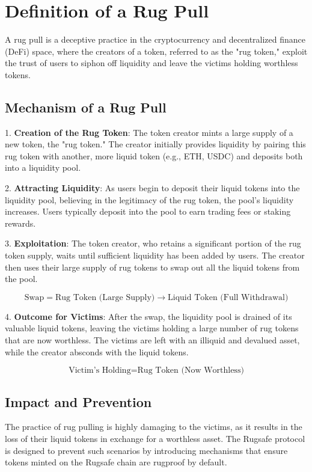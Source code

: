 \documentclass{article}
\begin{document}
\section{Definition of a Rug Pull}

A rug pull is a deceptive practice in the cryptocurrency and decentralized finance (DeFi) space, where the creators of a token, referred to as the "rug token," exploit the trust of users to siphon off liquidity and leave the victims holding worthless tokens.

\subsection{Mechanism of a Rug Pull}

1. \textbf{Creation of the Rug Token}: The token creator mints a large supply of a new token, the "rug token." The creator initially provides liquidity by pairing this rug token with another, more liquid token (e.g., ETH, USDC) and deposits both into a liquidity pool.

2. \textbf{Attracting Liquidity}: As users begin to deposit their liquid tokens into the liquidity pool, believing in the legitimacy of the rug token, the pool's liquidity increases. Users typically deposit into the pool to earn trading fees or staking rewards.

3. \textbf{Exploitation}: The token creator, who retains a significant portion of the rug token supply, waits until sufficient liquidity has been added by users. The creator then uses their large supply of rug tokens to swap out all the liquid tokens from the pool.

\[
\text{Swap} = \text{Rug Token (Large Supply)} \rightarrow \text{Liquid Token (Full Withdrawal)}
\]

4. \textbf{Outcome for Victims}: After the swap, the liquidity pool is drained of its valuable liquid tokens, leaving the victims holding a large number of rug tokens that are now worthless. The victims are left with an illiquid and devalued asset, while the creator absconds with the liquid tokens.

\[
\text{Victim's Holding} = \text{Rug Token (Now Worthless)}
\]

\subsection{Impact and Prevention}

The practice of rug pulling is highly damaging to the victims, as it results in the loss of their liquid tokens in exchange for a worthless asset. The Rugsafe protocol is designed to prevent such scenarios by introducing mechanisms that ensure tokens minted on the Rugsafe chain are rugproof by default.
\end{document}
